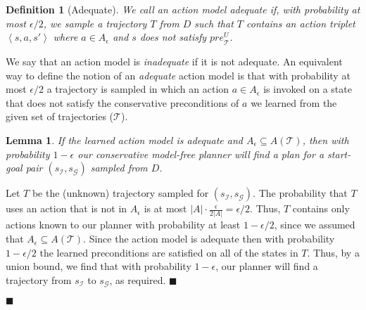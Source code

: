\documentclass[letterpaper]{article}
\newtheorem{definition}{Definition}
\newtheorem{lemma}{Lemma}
\newenvironment{proof}{\noindent{\bf Proof:~~}}{\qed}
\newcommand{\tuple}[1]{\ensuremath{\left \langle #1 \right \rangle }}
\newcommand{\qed}{\hfill\ensuremath{\blacksquare}}
\newcommand{\pre}{\textit{pre}}
\begin{document}
\begin{proof}

\begin{definition}[Adequate]
We call an action model {\em adequate} if, with probability at most $\epsilon/2$, we sample a trajectory $T$ from $D$ such that $T$ contains an action triplet $\tuple{s,a,s'}$  where $a\in A_\epsilon$ and $s$ does not satisfy $\pre_\mathcal{T}^U$. 
\label{def:adequate}
\end{definition}
We say that an action model is {\em inadequate} if it is not adequate. 
An equivalent way to define the notion of an {\em adequate} action model is
that with probability at most $\epsilon/2$ 
a trajectory is sampled in which an action $a\in A_\epsilon$ is invoked on a state that 
does not satisfy the conservative preconditions of $a$ we learned from the given set of trajectories ($\mathcal{T}$).  


\begin{lemma}
	If the learned action model is adequate and $A_\epsilon\subseteq A(\mathcal{T})$, 
	then with probability $1-\epsilon$ our conservative model-free planner will find a plan for a start-goal pair $(s_\mathcal{I},s_\mathcal{G})$ sampled from $D$.
	\label{lem:plan-existance}
\end{lemma}
\begin{proof}
	Let $T$ be the (unknown) trajectory sampled for $(s_\mathcal{I},s_\mathcal{G})$. 
	The probability that $T$ uses an action that is not in 
	$A_\epsilon$ is at most $|A|\cdot\frac{\epsilon}{2|A|}=\epsilon/2$. 
	Thus, $T$ contains only actions known to our planner with probability at least $1-\epsilon/2$, since we assumed that $A_\epsilon\subseteq A(\mathcal{T})$. 
	Since the action model is adequate then with probability $1-\epsilon/2$ the learned preconditions are satisfied on all of the states in $T$. Thus, by a union bound, we find that with probability $1-\epsilon$, our planner will find a trajectory from $s_\mathcal{I}$ to $s_\mathcal{G}$, as required. 
\end{proof}



\end{proof}
\end{document}
